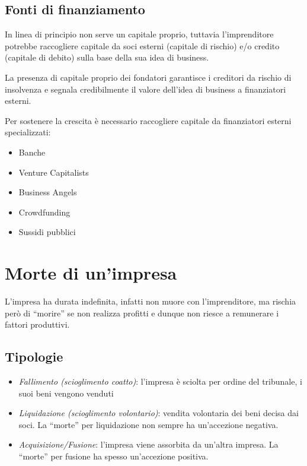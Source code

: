 \subsection{Fonti di finanziamento}

In linea di principio non serve un capitale proprio, tuttavia l’imprenditore
potrebbe raccogliere capitale da soci esterni (capitale di rischio) e/o credito
(capitale di debito) sulla base della sua idea di business.

La presenza di capitale proprio dei fondatori garantisce i creditori
da rischio di insolvenza e segnala credibilmente il valore dell’idea di
business a finanziatori esterni.

Per sostenere la crescita è necessario raccogliere capitale da finanziatori
esterni specializzati:
\begin{itemize}
    \item Banche
    \item Venture Capitalists
    \item Business Angels
    \item Crowdfunding
    \item Sussidi pubblici
\end{itemize}

\section{Morte di un'impresa}
L’impresa ha durata indefinita, infatti non muore con l’imprenditore, ma
rischia però di ``morire'' se non realizza profitti e dunque non riesce a
remunerare i fattori produttivi.

\subsection{Tipologie}

\begin{itemize}
    \item \emph{Fallimento (scioglimento coatto)}: l’impresa è sciolta per
    ordine del tribunale, i suoi beni vengono venduti
    \item \emph{Liquidazione (scioglimento volontario)}: vendita volontaria dei beni decisa dai
    soci. La ``morte'' per liquidazione non sempre ha un’accezione negativa.
    \item \emph{Acquisizione/Fusione}: l’impresa viene assorbita da un'altra
    impresa. La ``morte'' per fusione ha spesso un'accezione positiva.
\end{itemize}

